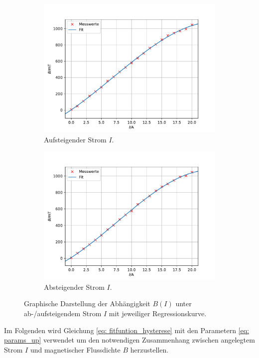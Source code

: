 \begin{figure}
  \centering
  \begin{subfigure}{0.48\textwidth}
    \centering
  \includegraphics[width = \textwidth]{../Messdaten/plots/hysterese_aufsteigend.pdf}
  \caption{Aufsteigender Strom $I$.}
  \label{fig: hysterese_aufsteigend}
\end{subfigure}
\hfill
  \begin{subfigure}{0.48\textwidth}
  \centering
  \includegraphics[width = \textwidth]{../Messdaten/plots/hysterese_absteigend.pdf}
  \caption{Absteigender Strom $I$.}
  \label{fig: hysterese_absteigend}
\end{subfigure}
\caption{Graphische Darstellung der Abhängigkeit $B(I)$ unter ab-/aufsteigendem Strom $I$ mit jeweiliger Regressionskurve.}
\label{fig: hysterese_fit}
\end{figure}
Im Folgenden wird Gleichung \eqref{eq: fitfuntion_hysterese} mit den Parametern \eqref{eq: params_up}
verwendet um den notwendigen Zusammenhang zwischen angelegtem Strom $I$ und magnetischer Flussdichte $B$ herzustellen.
